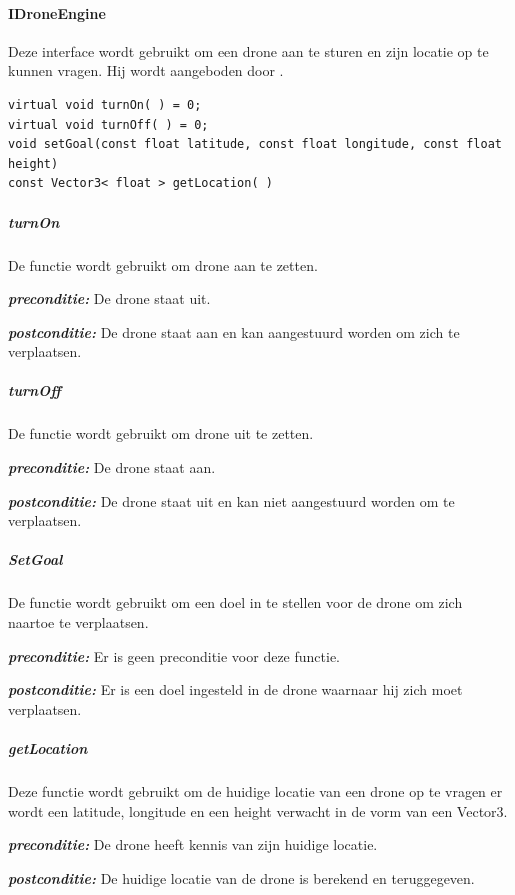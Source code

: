 \documentclass[a4paper, 11pt, oneside]{report}
\begin{document}
\paragraph{IDroneEngine}
\label{DetailedDesign:ros:extern:interfaces:IDroneEngine}
Deze interface wordt gebruikt om een drone aan te sturen en zijn locatie op te kunnen vragen. Hij wordt aangeboden door .

\begin{lstlisting}
virtual void turnOn( ) = 0;
virtual void turnOff( ) = 0;
void setGoal(const float latitude, const float longitude, const float height)
const Vector3< float > getLocation( )
\end{lstlisting}

\subparagraph{turnOn}
\label{DetailedDesign:ros:extern:interfaces:IDroneEngine:turnOn}
De functie wordt gebruikt om drone aan te zetten.

\textbf{\textit{preconditie:}} De drone staat uit.

\textbf{\textit{postconditie:}} De drone staat aan en kan aangestuurd worden om zich te verplaatsen.


\subparagraph{turnOff}
\label{DetailedDesign:ros:extern:interfaces:IDroneEngine:turnOff}
De functie wordt gebruikt om drone uit te zetten.

\textbf{\textit{preconditie:}} De drone staat aan.

\textbf{\textit{postconditie:}} De drone staat uit en kan niet aangestuurd worden om te verplaatsen.



\subparagraph{SetGoal}
\label{DetailedDesign:ros:extern:interfaces:IDroneEngine:SetGoal}
De functie wordt gebruikt om een doel in te stellen voor de drone om zich naartoe te verplaatsen.

\textbf{\textit{preconditie:}} Er is geen preconditie voor deze functie.

\textbf{\textit{postconditie:}} Er is een doel ingesteld in de drone waarnaar hij zich moet verplaatsen.


\subparagraph{getLocation}
\label{DetailedDesign:ros:extern:interfaces:IDroneEngine:getLocation}
Deze functie wordt gebruikt om de huidige locatie van een drone op te vragen er wordt een latitude, longitude en een height verwacht in de vorm van een Vector3.

\textbf{\textit{preconditie:}} De drone heeft kennis van zijn huidige locatie.

\textbf{\textit{postconditie:}} De huidige locatie van de drone is berekend en teruggegeven.
\end{document}
